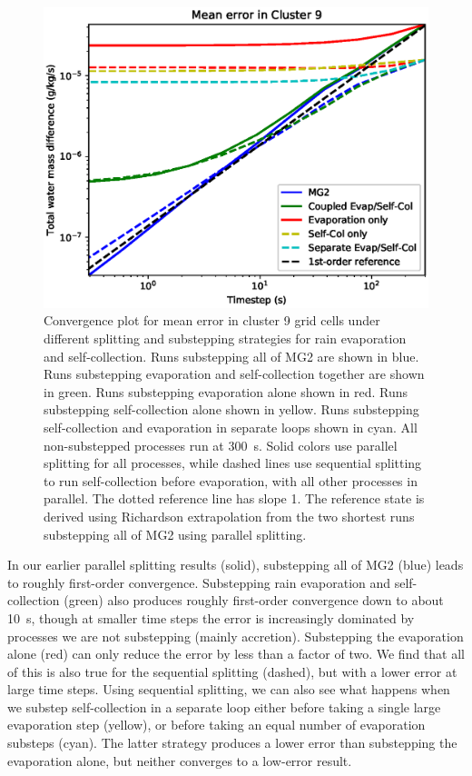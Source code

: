 \documentclass [11pt, proquest] {uwthesis}[2020/02/24]
\begin{document}
\begin{figure}[htbp]
  \includegraphics[width=6.5in]{substep_convergence_mean_seq_c9_richext.eps}
  \caption[Convergence plot for mean MG2 error in a cluster of rainy, cloudless grid cells using different splitting and substepping strategies]{Convergence plot for mean error in cluster 9 grid cells under different splitting and substepping strategies for rain evaporation and self-collection. Runs substepping all of MG2 are shown in blue. Runs substepping evaporation and self-collection together are shown in green. Runs substepping evaporation alone shown in red. Runs substepping self-collection alone shown in yellow. Runs substepping self-collection and evaporation in separate loops shown in cyan. All non-substepped processes run at \SI{300}{\second}. Solid colors use parallel splitting for all processes, while dashed lines use sequential splitting to run self-collection before evaporation, with all other processes in parallel. The dotted reference line has slope \num{1}. The reference state is derived using Richardson extrapolation from the two shortest runs substepping all of MG2 using parallel splitting.}
  \label{fig:convergence-splitting}
\end{figure}

In our earlier parallel splitting results (solid), substepping all of MG2 (blue) leads to roughly first-order convergence. Substepping rain evaporation and self-collection (green) also produces roughly first-order convergence down to about \SI{10}{\second}, though at smaller time steps the error is increasingly dominated by processes we are not substepping (mainly accretion). Substepping the evaporation alone (red) can only reduce the error by less than a factor of two. We find that all of this is also true for the sequential splitting (dashed), but with a lower error at large time steps. Using sequential splitting, we can also see what happens when we substep self-collection in a separate loop either before taking a single large evaporation step (yellow), or before taking an equal number of evaporation substeps (cyan). The latter strategy produces a lower error than substepping the evaporation alone, but neither converges to a low-error result.
\end{document}

